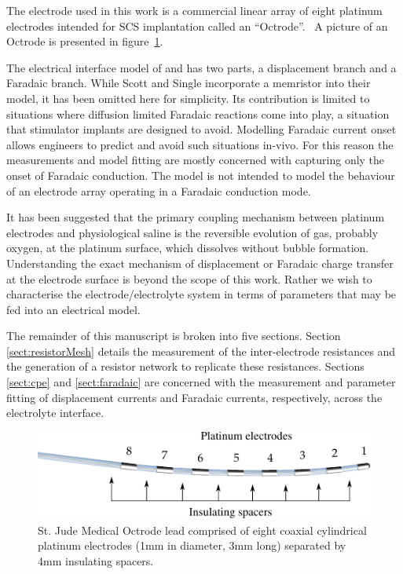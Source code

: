 \documentclass[journal, a4paper]{IEEEtran}
\begin{document}
The electrode used in this work is a commercial linear array of eight platinum electrodes intended for SCS implantation called an ``Octrode''.~\cite{StJudeOctrode} A picture of an Octrode is presented in figure~\ref{fig:octrode}.

The electrical interface model of \cite{Franks2005} and \cite{ScottSingle2013} has two parts, a displacement branch and a Faradaic branch. While Scott and Single \cite{ScottSingle2013} incorporate a memristor into their model, it has been omitted here for simplicity. Its contribution is limited to situations where diffusion limited Faradaic reactions come into play, a situation that stimulator implants are designed to avoid. {\color{blue} Modelling Faradaic current onset allows engineers to predict and avoid such situations in-vivo. For this reason the measurements and model fitting are mostly concerned with capturing only the onset of Faradaic conduction. The model is not intended to model the behaviour of an electrode array operating in a Faradaic conduction mode.}

It has been suggested that the primary coupling mechanism between platinum electrodes and physiological saline is the reversible evolution of gas, probably oxygen, at the platinum surface, which dissolves without bubble formation.\cite{Greatbatch1969} Understanding the exact mechanism of displacement or Faradaic charge transfer at the electrode surface is beyond the scope of this work. Rather we wish to characterise the electrode/electrolyte system in terms of parameters that may be fed into an electrical model.

{
    \color{blue}
    The remainder of this manuscript is broken into five sections. Section \ref{sect:resistorMesh} details the measurement of the inter-electrode resistances and the generation of a resistor network to replicate these resistances.
    Sections \ref{sect:cpe} and \ref{sect:faradaic} are concerned with the measurement and parameter fitting of displacement currents and Faradaic currents, respectively, across the electrolyte interface.
}

\begin{figure}
    \begin{center}
    \includegraphics{graphics/StJudeOctrodeDiagram}
    \end{center}
    \caption{St. Jude Medical Octrode lead comprised of eight coaxial cylindrical platinum electrodes (1mm in diameter, 3mm long) separated by 4mm insulating spacers.}
    \label{fig:octrode}
\end{figure}
\end{document}
